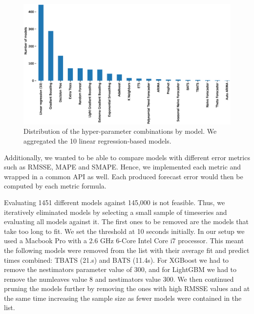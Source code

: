\begin{figure}
\centerline{\includegraphics[scale=.6]{Figures/model_numbers.eps}}
\caption{Distribution of the hyper-parameter combinations by model. We aggregated the 10 linear regression-based models.}
\label{fig:model_numbers}
\end{figure}


Additionally, we wanted to be able to compare models with different error metrics such as RMSSE, MAPE and SMAPE. Hence, we implemented each metric and wrapped in a common API as well. Each produced forecast error would then be computed by each metric formula.

Evaluating 1451 different models against 145,000 is not feasible. Thus, we iteratively eliminated models by selecting a small sample of timeseries and evaluating all models against it. The first ones to be removed are the models that take too long to fit. We set the threshold at 10 seconds initially. In our setup we used a Macbook Pro with a 2.6 GHz 6-Core Intel Core i7 processor. This meant the following models were removed from the list with their average fit and predict times combined: TBATS (21.s) and BATS (11.4s). For XGBoost we had to remove the n\textunderscore estimators parameter value of 300, and for LightGBM we had to remove the num\textunderscore leaves value 8 and n\textunderscore estimators value 300. We then continued pruning the models further by removing the ones with high RMSSE values and at the same time increasing the sample size as fewer models were contained in the list. 

